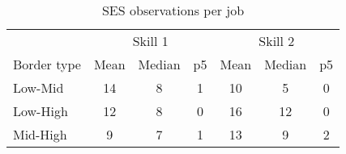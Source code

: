 \begin{table}
	\caption{SES observations per job}
	\label{tab:sesBorderJobs}
	\centering
	\begin{tabular}{lcccccc}
	
& \multicolumn{3}{c}{Skill 1}& \multicolumn{3}{c}{Skill 2}\\
Border type & Mean & Median& p5 & Mean & Median & p5 \\
\midrule
Low-Mid&14&8&1&10&5&0 \\
Low-High&12&8&0&16&12&0 \\
Mid-High&9&7&1&13&9&2 \\
\bottomrule
\end{tabular}
\end{table}
